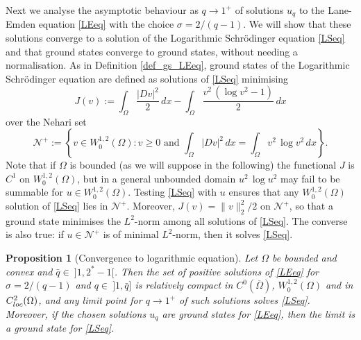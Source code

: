 \documentclass[12pt]{amsart}
\numberwithin{equation}{section}
\theoremstyle{plain}
\theoremstyle{plain}
\newtheorem{proposition}[theorem]{Proposition}
\theoremstyle{plain}
\theoremstyle{definition}
\renewcommand{\ge}{\geqslant}
\begin{document}
Next we analyse the asymptotic behaviour as $q\to 1^+$ of solutions $u_q$ to the Lane-Emden equation \eqref{LEeq} with the choice $\sigma=2/(q-1)$. 
We will show that these solutions converge to a solution of the Logarithmic Schr\"odinger equation \eqref{LSeq} and that ground states converge to ground states, without needing a normalisation. 
As in Definition \ref{def_gs_LEeq}, ground states of the Logarithmic Schr\"odinger equation are defined as solutions of \eqref{LSeq} minimising
\[
J(v):=\int_\Omega\frac{|D v|^2}{2}\, dx-\int_\Omega\frac{v^2\, (\log v^2-1)}{2}\, dx
\]
over the Nehari set
\[
 {\mathcal N}^+:=\left\{v\in W^{1,2}_0(\Omega): v\ge 0 \text{ and }\int_\Omega |D v|^2\, dx=\int_\Omega v^2\, \log v^2\, dx\right\}.
\]
Note that if $\Omega$ is bounded (as we will suppose in the following) the functional $J$ is $C^1$ on $W^{1,2}_0(\Omega)$, but in a general unbounded domain $u^2\, \log u^2$ may fail to be summable for $u\in W^{1,2}_0(\Omega)$. 
Testing \eqref{LSeq} with $u$ ensures that any $W^{1,2}_0(\Omega)$ solution of \eqref{LSeq} lies in ${\mathcal N}^+$. 
Moreover, $J(v)= \|v\|_2^2/2$ on ${\mathcal N}^+$, so that a ground state minimises the $L^2$-norm among all solutions of \eqref{LSeq}.
The converse is also true: if $u\in {\mathcal N}^+$ is of minimal $L^2$-norm, then it solves \eqref{LSeq}.

\begin{proposition}[Convergence to logarithmic equation]
\label{prop_conv_gs} 
Let $\Omega$ be bounded and convex and $\bar q\in \ ]1, 2^*-1[$. 
Then the set of positive solutions of \eqref{LEeq} for $\sigma=2/(q-1)$ and $q\in \ ]1, \bar q]$ is relatively compact in $C^0(\overline\Omega)$, $W^{1,2}_0(\Omega)$ and in $C^2_{\rm loc}(\Omega)$, and any limit point for $q\to 1^+$ of such solutions solves \eqref{LSeq}. 
Moreover, if the chosen solutions $u_q$ are ground states for \eqref{LEeq}, then the limit is a ground state for \eqref{LSeq}.
\end{proposition}
\end{document}
